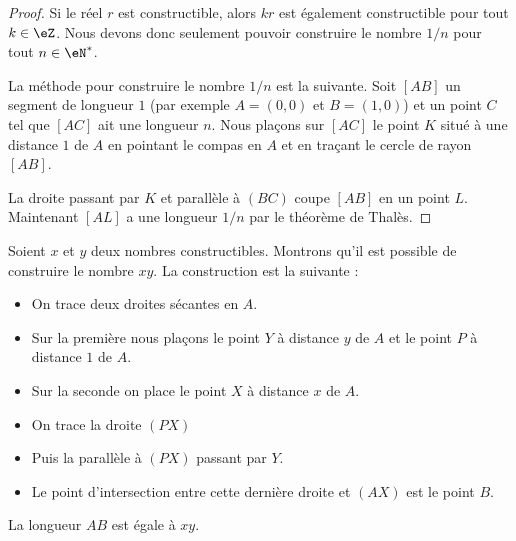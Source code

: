 \begin{proof}
    Si le réel \( r\) est constructible, alors \( kr\) est également constructible pour tout \( k\in \eZ\). Nous devons donc seulement pouvoir construire le nombre \( 1/n\) pour tout \( n\in \eN^*\).

    \begin{center}
   
    \end{center}

    La méthode pour construire le nombre \( 1/n\) est la suivante. Soit \( [AB]\) un segment de longueur \( 1\) (par exemple \( A=(0,0)\) et \( B=(1,0)\)) et un point \( C\) tel que \( [AC]\) ait une longueur \( n\). Nous plaçons sur \( [AC]\) le point \( K\) situé à une distance \( 1\) de \( A\) en pointant le compas en \( A\) et en traçant le cercle de rayon \( [AB]\).

    La droite passant par \( K\) et parallèle à \( (BC)\) coupe \( [AB]\) en un point \( L\). Maintenant \( [AL]\) a une longueur \( 1/n\) par le théorème de Thalès.

\end{proof}

\begin{example}    \label{ExGROooIosiBt}
    Soient \( x\) et \( y\) deux nombres constructibles. Montrons qu'il est possible de construire le nombre \( xy\). La construction est la suivante :

    \begin{center}
   
    \end{center}

    \begin{itemize}
        \item On trace deux droites sécantes en \( A\).
        \item Sur la première nous plaçons le point \( Y\) à distance \( y\) de \( A\) et le point \( P\) à distance \( 1\) de \( A\).
        \item Sur la seconde on place le point \( X\) à distance \( x\) de \( A\).
        \item On trace la droite \( (PX)\)
        \item Puis la parallèle à \( (PX)\) passant par \( Y\).
        \item Le point d'intersection entre cette dernière droite et $(AX)$ est le point \( B\).
    \end{itemize}
    La longueur \( AB\) est égale à \( xy\).
\end{example}

